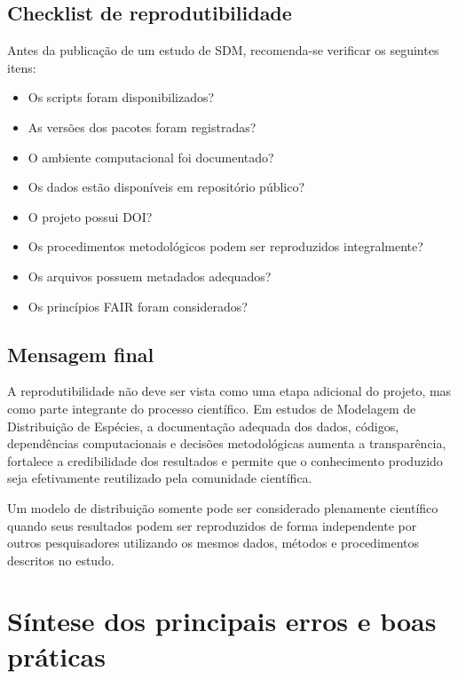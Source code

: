 \subsection{Checklist de reprodutibilidade}

Antes da publicação de um estudo de SDM, recomenda-se verificar os seguintes
itens:

\begin{itemize}
	\item Os scripts foram disponibilizados?
	\item As versões dos pacotes foram registradas?
	\item O ambiente computacional foi documentado?
	\item Os dados estão disponíveis em repositório público?
	\item O projeto possui DOI?
	\item Os procedimentos metodológicos podem ser reproduzidos integralmente?
	\item Os arquivos possuem metadados adequados?
	\item Os princípios FAIR foram considerados?
\end{itemize}

\subsection{Mensagem final}

A reprodutibilidade não deve ser vista como uma etapa adicional do projeto,
mas como parte integrante do processo científico. Em estudos de Modelagem de
Distribuição de Espécies, a documentação adequada dos dados, códigos,
dependências computacionais e decisões metodológicas aumenta a transparência,
fortalece a credibilidade dos resultados e permite que o conhecimento produzido
seja efetivamente reutilizado pela comunidade científica.

\begin{sdmkeybox}
	Um modelo de distribuição somente pode ser considerado plenamente
	científico quando seus resultados podem ser reproduzidos de forma
	independente por outros pesquisadores utilizando os mesmos dados,
	métodos e procedimentos descritos no estudo.
\end{sdmkeybox}

\section{Síntese dos principais erros e boas práticas}

